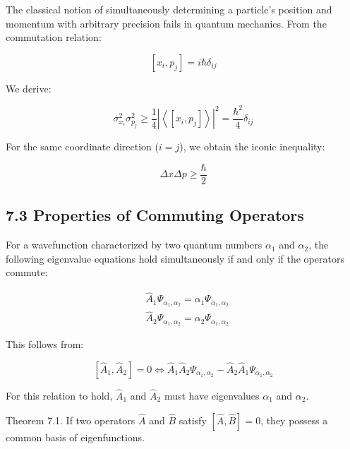 \documentclass[italian]{HKNdocument}
\begin{document}
The classical notion of simultaneously determining a particle's position and momentum with arbitrary precision fails in quantum mechanics. From the commutation relation:

\begin{equation*}
\left[x_{i}, p_{j}\right]=i \hbar \delta_{i j} \tag{7.18}
\end{equation*}

We derive:

\begin{equation*}
\sigma_{x_{i}}^{2} \sigma_{p_{j}}^{2} \geq \frac{1}{4}\left|\left\langle\left[x_{i}, p_{j}\right]\right\rangle\right|^{2}=\frac{\hbar^{2}}{4} \delta_{i j} \tag{7.19}
\end{equation*}

For the same coordinate direction ($i=j$), we obtain the iconic inequality:

\begin{equation*}
\Delta x \Delta p \geq \frac{\hbar}{2} \tag{7.20}
\end{equation*}

\subsection*{7.3 Properties of Commuting Operators}
For a wavefunction characterized by two quantum numbers $\alpha_1$ and $\alpha_2$, the following eigenvalue equations hold simultaneously if and only if the operators commute:

\begin{align*}
& \hat{A}_{1} \Psi_{\alpha_{1}, \alpha_{2}}=\alpha_{1} \Psi_{\alpha_{1}, \alpha_{2}} \\
& \hat{A}_{2} \Psi_{\alpha_{1}, \alpha_{2}}=\alpha_{2} \Psi_{\alpha_{1}, \alpha_{2}} \tag{7.21}
\end{align*}

This follows from:

\begin{equation*}
\left[\hat{A}_{1}, \hat{A}_{2}\right]=0 \Longleftrightarrow \hat{A}_{1} \hat{A}_{2} \Psi_{\alpha_{1}, \alpha_{2}}-\hat{A}_{2} \hat{A}_{1} \Psi_{\alpha_{1}, \alpha_{2}} \tag{7.22}
\end{equation*}

For this relation to hold, $\hat{A}_1$ and $\hat{A}_2$ must have eigenvalues $\alpha_1$ and $\alpha_2$.

Theorem 7.1. If two operators $\hat{A}$ and $\hat{B}$ satisfy $[\hat{A}, \hat{B}]=0$, they possess a common basis of eigenfunctions.
\end{document}
